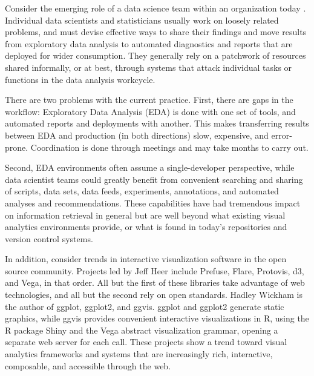 

\maketitle


Consider the emerging role of a data science team within an
organization today \cite{Keim:2008:VAS}.
%
Individual data scientists and statisticians usually work on loosely
related problems, and must devise effective ways to share their findings
and move results from exploratory data analysis to automated diagnostics
and reports that are deployed for wider consumption.
They generally rely on a patchwork of resources shared informally,
or at best, through systems that attack individual tasks or functions
in the data analysis workcycle. %

There are two problems with the current practice. First, there are
gaps in the workflow: Exploratory Data Analysis (EDA) is done with one
set of tools, and automated reports and deployments with another. This
makes transferring results between EDA and production (in both
directions) slow, expensive, and error-prone. Coordination is done
through meetings and may take months to carry out.

Second, EDA environments often assume a single-developer perspective,
while data scientist teams could greatly benefit from convenient searching
and sharing of scripts, data sets, data feeds, experiments, annotations,
and automated analyses and recommendations. These capabilities have had
tremendous impact on information retrieval in general but are well
beyond what existing visual analytics environments provide, or what
is found in today's repositories and version control
systems.\cite{Koren:2009:FIT}

In addition, consider trends in interactive visualization software
in the open source community.  Projects led by Jeff Heer
include Prefuse, Flare, Protovis, d3, and Vega, in that order.
All but the first of these libraries take advantage of web technologies,
and all but the second rely on open standards. Hadley Wickham is the
author of ggplot, ggplot2, and ggvis. ggplot and ggplot2 generate
static graphics, while ggvis provides convenient interactive visualizations
in R, using the R package Shiny and the Vega abstract visualization grammar,
opening a separate web server for each call. These projects show
a trend toward visual analytics frameworks and systems that are
increasingly rich, interactive, composable, and accessible through the web.

